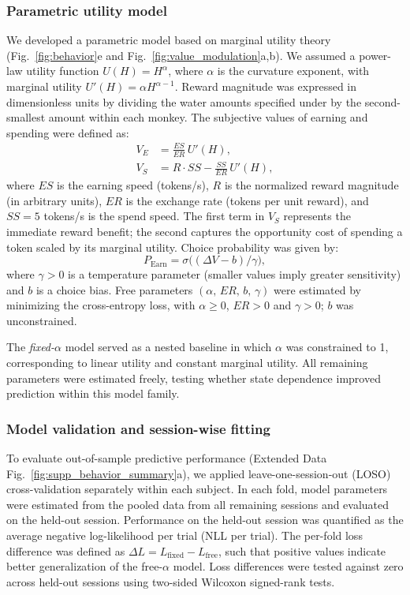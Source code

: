 \documentclass[pdflatex,sn-mathphys-num]{sn-jnl}%
\begin{document}
\subsubsection{Parametric utility model}\label{sec:m_param}
We developed a parametric model based on marginal utility theory (Fig.~\ref{fig:behavior}e and Fig.~\ref{fig:value_modulation}a,b). We assumed a power-law utility function $U(H) = H^\alpha$, where $\alpha$ is the curvature exponent, with marginal utility $U'(H)=\alpha H^{\alpha-1}$. Reward magnitude was expressed in dimensionless units by dividing the water amounts specified under  by the second-smallest amount within each monkey. The subjective values of earning and spending were defined as:
\begin{align}
V_E &= \frac{\mathit{ES}}{\mathit{ER}}\,U'(H), \label{eq:VE}\\
V_S &= R \cdot \mathit{SS} - \frac{\mathit{SS}}{\mathit{ER}}\,U'(H), \label{eq:VS}
\end{align}
where $\mathit{ES}$ is the earning speed (tokens/s), $R$ is the normalized reward magnitude (in arbitrary units), $\mathit{ER}$ is the exchange rate (tokens per unit reward), and $\mathit{SS} = 5$ tokens/s is the spend speed. The first term in $V_S$ represents the immediate reward benefit; the second captures the opportunity cost of spending a token scaled by its marginal utility. Choice probability was given by:
\begin{equation}
P_\mathrm{Earn} = \sigma\bigl((\Delta V-b)/\gamma\bigr),
\end{equation}
where $\gamma > 0$ is a temperature parameter (smaller values imply greater sensitivity) and $b$ is a choice bias. Free parameters $(\alpha,\, \mathit{ER},\, b,\, \gamma)$ were estimated by minimizing the cross-entropy loss, with $\alpha\geq0$, $\mathit{ER}>0$ and $\gamma>0$; $b$ was unconstrained.

The \textit{fixed-$\alpha$} model served as a nested baseline in which $\alpha$ was constrained to 1, corresponding to linear utility and constant marginal utility. All remaining parameters were estimated freely, testing whether state dependence improved prediction within this model family.

\subsubsection{Model validation and session-wise fitting}\label{sec:m_validation}
To evaluate out-of-sample predictive performance (Extended Data Fig.~\ref{fig:supp_behavior_summary}a), we applied leave-one-session-out (LOSO) cross-validation separately within each subject. In each fold, model parameters were estimated from the pooled data from all remaining sessions and evaluated on the held-out session. Performance on the held-out session was quantified as the average negative log-likelihood per trial (NLL per trial). The per-fold loss difference was defined as $\Delta L=L_\mathrm{fixed}-L_\mathrm{free}$, such that positive values indicate better generalization of the free-$\alpha$ model. Loss differences were tested against zero across held-out sessions using two-sided Wilcoxon signed-rank tests.
\end{document}
